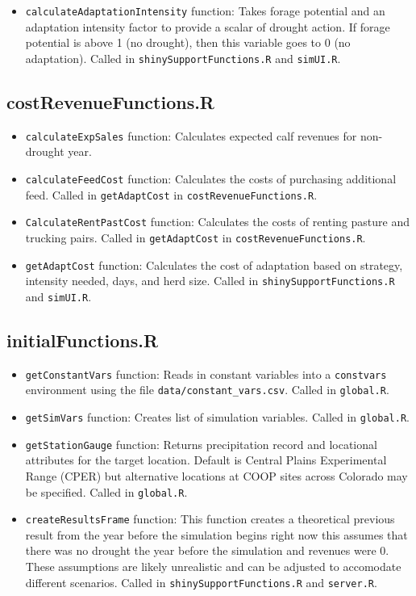 \documentclass[11pt]{article}
\begin{document}
\begin{itemize}
	\item \verb!calculateAdaptationIntensity! function: Takes forage potential and an adaptation intensity factor to provide a scalar of drought action. If forage potential is above 1 (no drought), then this variable goes to 0 (no adaptation). Called in \verb!shinySupportFunctions.R! and \verb!simUI.R!.
\end{itemize}

\subsection{costRevenueFunctions.R}

\begin{itemize}
	\item \verb!calculateExpSales! function: Calculates expected calf revenues for non-drought year. 
	\item \verb!calculateFeedCost! function: Calculates the costs of purchasing additional feed. Called in \verb!getAdaptCost! in \verb!costRevenueFunctions.R!. 
	\item \verb!CalculateRentPastCost! function: Calculates the costs of renting pasture and trucking pairs. Called in \verb!getAdaptCost! in \verb!costRevenueFunctions.R!.
	\item \verb!getAdaptCost! function: Calculates the cost of adaptation based on strategy, intensity needed, days, and herd size. Called in \verb!shinySupportFunctions.R! and \verb!simUI.R!.
\end{itemize}

\subsection{initialFunctions.R}

\begin{itemize}
	\item \verb!getConstantVars! function: Reads in constant variables into a
  \verb!constvars! environment using the  file \verb!data/constant_vars.csv!. Called in \verb!global.R!.
  	\item \verb!getSimVars! function: Creates list of simulation variables. Called in \verb!global.R!.
  	\item \verb!getStationGauge! function: Returns precipitation record and locational attributes for the target location. Default is Central Plains Experimental Range (CPER) but alternative locations at COOP sites across Colorado may be specified. Called in \verb!global.R!.
  	\item \verb!createResultsFrame! function: This function creates a theoretical previous result from the year before the simulation begins right now this assumes that there was no drought the year before the simulation and revenues were 0. These assumptions are likely unrealistic and can be adjusted to accomodate different scenarios. Called in \verb!shinySupportFunctions.R! and \verb!server.R!.
\end{itemize}
\end{document}
